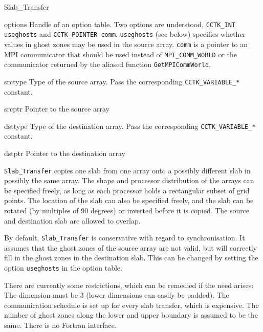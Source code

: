 \begin{FunctionDescription}{Slab\_Transfer}{}
\begin{ParameterSection}
\begin{Parameter}{options}
Handle of an option table.  Two options are understood,
\texttt{CCTK\_INT useghosts} and \texttt{CCTK\_POINTER comm}.
\texttt{useghosts} (see below) specifies whether values in ghost zones
may be used in the source array.  \texttt{comm} is a pointer to an MPI
communicator that should be used instead of \texttt{MPI\_COMM\_WORLD}
or the communicator returned by the aliased function
\texttt{GetMPICommWorld}.
\end{Parameter}

\begin{Parameter}{srctype}
Type of the source array.  Pass the corresponding
\texttt{CCTK\_VARIABLE\_*} constant.
\end{Parameter}

\begin{Parameter}{srcptr}
Pointer to the source array
\end{Parameter}

\begin{Parameter}{dsttype}
Type of the destination array.  Pass the corresponding
\texttt{CCTK\_VARIABLE\_*} constant.
\end{Parameter}

\begin{Parameter}{dstptr}
Pointer to the destination array
\end{Parameter}
\end{ParameterSection}

\begin{Discussion}
\texttt{Slab\_Transfer} copies one slab from one array onto a possibly
different slab in possibly the same array.  The shape and processor
distribution of the arrays can be specified freely, as long as each
processor holds a rectangular subset of grid points.  The location of
the slab can also be specified freely, and the slab can be rotated (by
multiples of 90 degrees) or inverted before it is copied.  The source
and destination slab are allowed to overlap.

By default, \texttt{Slab\_Transfer} is conservative with regard to
synchronisation.  It assumes that the ghost zones of the source array
are not valid, but will correctly fill in the ghost zones in the
destination slab.  This can be changed by setting the option
\texttt{useghosts} in the option table.

There are currently some restrictions, which can be remedied if the
need arises: The dimension must be 3 (lower dimensions can easily be
padded).  The communication schedule is set up for every slab
transfer, which is expensive.  The number of ghost zones along the
lower and upper boundary is assumed to be the same.  There is no
Fortran interface.
\end{Discussion}


\end{FunctionDescription}
